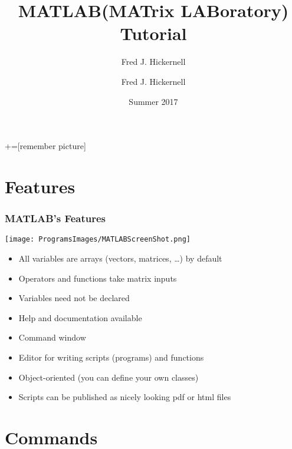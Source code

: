 \documentclass[12pt, compress,xcolor={usenames,dvipsnames}]{beamer} %
\newcommand{\Matlab}{MATLAB\xspace}
\begin{document}
	+=[remember picture]
	\everymath{\displaystyle}
	
	\title[MATLAB Tutorial]{\Matlab (MATrix LABoratory) Tutorial}
	\author[Fred J. Hickernell]{Fred J. Hickernell}
\author{Fred J. Hickernell}
	\date{Summer 2017}
	\frame[label=title]{\titlepage}
	
	\section{Features}
	\begin{frame}\frametitle{\Matlab's Features}
		
		\centerline{\texttt{[image: ProgramsImages/MATLABScreenShot.png]}}
		\begin{itemize}
						
			\item All variables are arrays (vectors, matrices, \ldots) by default
			
			\item Operators and functions take matrix inputs
			
			\item Variables need not be declared
			
			\item Help and documentation available
			
			\item Command window
			
			\item Editor for writing scripts (programs) and functions
			
			\item Object-oriented (you can define your own classes)
			
			\item Scripts can be published as nicely looking pdf or html files
			
		\end{itemize}
		
	\end{frame}

\section{Commands}
	
\end{document}
